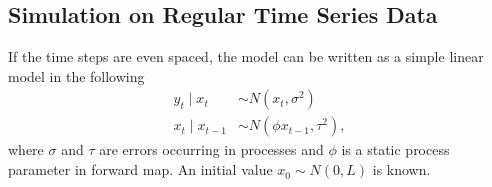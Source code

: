 

\subsection{Simulation on Regular Time Series Data}

If the time steps are even spaced, the model can be written as a simple linear model in the following 
\begin{align*}
y_t\mid x_t      &\sim N(x_t,\sigma^2) \\
x_t\mid x_{t-1} &\sim N(\phi x_{t-1},\tau^2),
\end{align*}
where $\sigma$ and $\tau$ are \iid  errors occurring in processes and $\phi$ is a static process parameter in forward map. An initial value $x_0\sim N(0,L)$ is known. 


